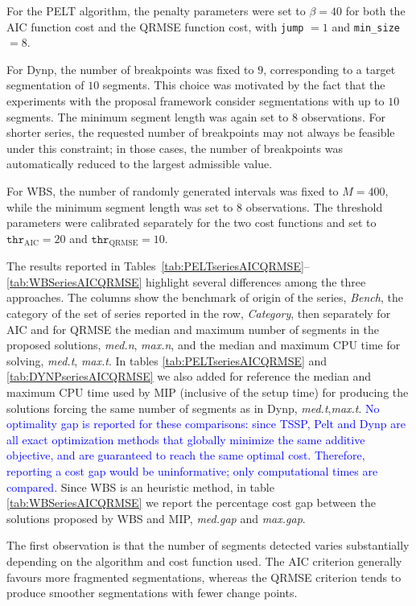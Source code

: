 \documentclass[preprints,article,submit,pdftex,moreauthors]{Definitions/mdpi}
\newcommand{\highlight}[1]{\textcolor{blue}{#1}}
\begin{document}
For the PELT algorithm, the penalty parameters were set to $\beta=40$ for both the AIC function cost and the QRMSE function cost, with \texttt{jump} $=1$ and \texttt{min\_size} $=8$.  

For Dynp, the number of breakpoints was fixed to $9$, corresponding to a target segmentation of $10$ segments. This choice was motivated by the fact that the experiments with the proposal framework consider segmentations with up to $10$ segments. The minimum segment length was again set to $8$ observations. For shorter series, the requested number of breakpoints may not always be feasible under this constraint; in those cases, the number of breakpoints was automatically reduced to the largest admissible value.

For WBS, the number of randomly generated intervals was fixed to $M=400$, while the minimum segment length was set to $8$ observations. The threshold parameters were calibrated separately for the two cost functions and set to $\texttt{thr}_{\text{AIC}}=20$ and $\texttt{thr}_{\text{QRMSE}}=10$. 

The results reported in Tables~\ref{tab:PELTseriesAICQRMSE}--\ref{tab:WBSeriesAICQRMSE} highlight several differences among the three approaches. The columns show the benchmark of origin of the series, {\it Bench}, the category of the set of series reported in the row, {\it Category}, then separately for AIC and for QRMSE the median and maximum number of segments in the proposed solutions, {\it med.n}, {\it max.n}, and the median and maximum CPU time for solving, {\it med.t}, {\it max.t}. In tables \ref{tab:PELTseriesAICQRMSE} and \ref{tab:DYNPseriesAICQRMSE} we also added for reference the median and maximum CPU time used by MIP (inclusive of the setup time) for producing the solutions forcing the same number of segments as in Dynp, {\it med.t},{\it max.t}. 
\highlight{No optimality gap is reported for these comparisons: since TSSP, Pelt and Dynp are all exact optimization methods that globally minimize the same additive objective, and are guaranteed to reach the same optimal cost. Therefore, reporting a cost gap would be uninformative; only computational times are compared.}
Since WBS is an heuristic method, in table \ref{tab:WBSeriesAICQRMSE} we report the percentage cost gap between the solutions proposed by WBS and MIP, {\it med.gap} and {\it max.gap}.

The first observation is that the number of segments detected varies substantially depending on the algorithm and cost function used.  The AIC criterion generally favours more fragmented segmentations, whereas the QRMSE criterion tends to produce smoother segmentations with fewer change points. 
\end{document}
